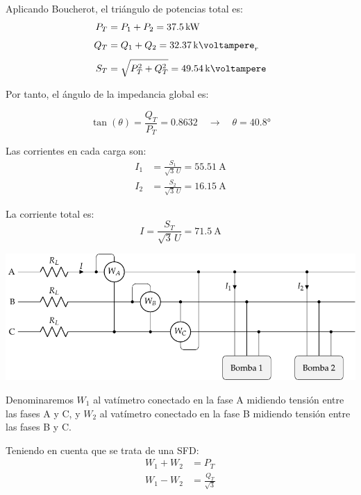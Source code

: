 \vspace{5mm}
 Aplicando Boucherot, el triángulo de potencias total es:
 \begin{align*}
   P_T &= P_1 + P_2 = \SI{37.5}{\kilo\watt}\\[4pt]
   Q_T &= Q_1 + Q_2 = \SI{32.37}{\kilo\voltampere}_r\\[4pt]
   S_T &= \sqrt{P_T^2 + Q_T^2} = \SI{49.54}{\kilo\voltampere}
 \end{align*}

\vspace{2mm}
 Por tanto, el ángulo de la impedancia global es:

\[
  \tan(\theta) = \frac{Q_T}{P_T} = 0.8632 \quad \rightarrow \quad \theta =
  \ang{40.8}
\]

\vspace{2mm}
Las corrientes en cada carga son:
\begin{align*}
  I_1 &= \frac{S_1}{\sqrt{3} \,U} = \SI{55.51}{\ampere}\\
  I_2 &= \frac{S_2}{\sqrt{3} \,U} = \SI{16.15}{\ampere}
\end{align*}

La corriente total es:
\[
  I = \frac{S_T}{{\sqrt{3} \,U}} = \SI{71.5}{\ampere}
\]

\begin{center}
    \includegraphics[width=.9\textwidth]{figuras/BT3_ej5_bombas_vatimetros.pdf}
\end{center}

\vspace{2mm}
Denominaremos $W_1$ al vatímetro conectado en la fase A midiendo
tensión entre las fases A y C, y $W_2$ al vatímetro conectado en
la fase B midiendo tensión entre las fases B y C. 

\vspace{2mm}
Teniendo en cuenta
que se trata de una SFD: 
\begin{align*}
  W_1 + W_2 &= P_T\\[3pt]
  W_1 - W_2 &= \frac{Q_T}{\sqrt{3}}
\end{align*}

